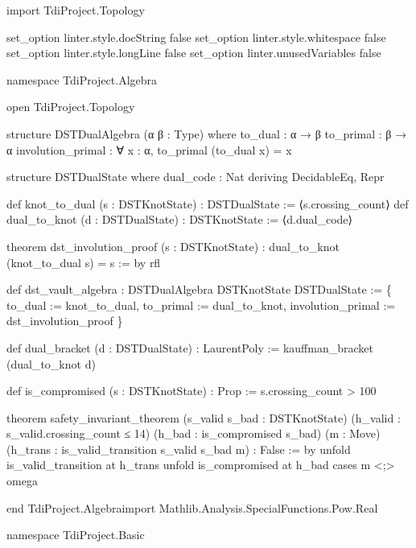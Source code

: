 \documentclass{article}
\newenvironment{Shaded}{%
  \begin{snugshade}%
}{%
  \end{snugshade}%
}%
\newenvironment{Highlighting}{%
}{%
}%
\newcommand{\NormalTok}[1]{#1}
\begin{document}
\begin{Shaded}
\begin{Highlighting}[]
\NormalTok{import TdiProject.Topology}

\NormalTok{set\_option linter.style.docString false}
\NormalTok{set\_option linter.style.whitespace false}
\NormalTok{set\_option linter.style.longLine false}
\NormalTok{set\_option linter.unusedVariables false}

\NormalTok{namespace TdiProject.Algebra}

\NormalTok{open TdiProject.Topology}

\NormalTok{structure DSTDualAlgebra (α β : Type) where}
\NormalTok{  to\_dual   : α → β}
\NormalTok{  to\_primal : β → α}
\NormalTok{  involution\_primal : ∀ x : α, to\_primal (to\_dual x) = x}

\NormalTok{structure DSTDualState where}
\NormalTok{  dual\_code : Nat}
\NormalTok{  deriving DecidableEq, Repr}

\NormalTok{def knot\_to\_dual (s : DSTKnotState) : DSTDualState := ⟨s.crossing\_count⟩}
\NormalTok{def dual\_to\_knot (d : DSTDualState) : DSTKnotState := ⟨d.dual\_code⟩}

\NormalTok{theorem dst\_involution\_proof (s : DSTKnotState) : dual\_to\_knot (knot\_to\_dual s) = s := by}
\NormalTok{  rfl}

\NormalTok{def dst\_vault\_algebra : DSTDualAlgebra DSTKnotState DSTDualState := \{}
\NormalTok{  to\_dual := knot\_to\_dual,}
\NormalTok{  to\_primal := dual\_to\_knot,}
\NormalTok{  involution\_primal := dst\_involution\_proof}
\NormalTok{\}}

\NormalTok{def dual\_bracket (d : DSTDualState) : LaurentPoly :=}
\NormalTok{  kauffman\_bracket (dual\_to\_knot d)}

\NormalTok{def is\_compromised (s : DSTKnotState) : Prop :=}
\NormalTok{  s.crossing\_count \textgreater{} 100}

\NormalTok{theorem safety\_invariant\_theorem (s\_valid s\_bad : DSTKnotState)}
\NormalTok{    (h\_valid : s\_valid.crossing\_count ≤ 14) (h\_bad : is\_compromised s\_bad)}
\NormalTok{    (m : Move) (h\_trans : is\_valid\_transition s\_valid s\_bad m) : False := by}
\NormalTok{  unfold is\_valid\_transition at h\_trans}
\NormalTok{  unfold is\_compromised at h\_bad}
\NormalTok{  cases m \textless{};\textgreater{} omega}

\NormalTok{end TdiProject.Algebraimport Mathlib.Analysis.SpecialFunctions.Pow.Real}

\NormalTok{namespace TdiProject.Basic}

\end{Highlighting}
\end{Shaded}
\end{document}
